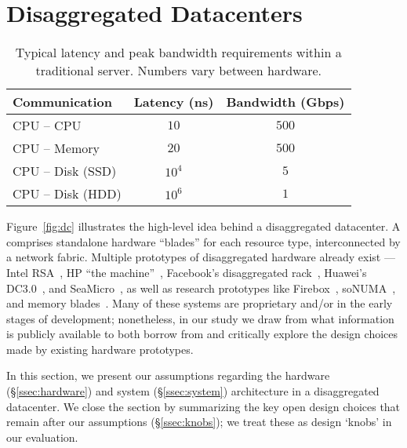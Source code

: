 \vspace{-0.1in}
\section{Disaggregated Datacenters}
\label{sec:summary}
\vspace{-0.05in}


\begin{table}
  \centering
  \small
  \begin{tabular}{l|c|c}
		\textbf{Communication} & \textbf{Latency (ns)} & \textbf{Bandwidth (Gbps)}\\\hline
	\hline
    CPU -- CPU & $10$ & $500$\\\hline
    CPU -- Memory & $20$ & $500$\\\hline
    CPU -- Disk (SSD) & $10^4$ & $5$\\\hline
    CPU -- Disk (HDD) & $10^6$ & $1$\\\hline
    \hline
  \end{tabular}
  \vspace{0.1in}
  \caption{\small{Typical latency and peak bandwidth requirements within a traditional server. Numbers vary between hardware.}}
  \label{tab:tech}
\end{table}

Figure~\ref{fig:dc} illustrates the high-level idea behind a disaggregated datacenter.
A \dis comprises standalone hardware ``blades'' for each resource type,  interconnected by a network fabric.
Multiple prototypes of disaggregated hardware already exist --- Intel RSA~\cite{rsa}, HP ``the machine''~\cite{hptm}, Facebook's disaggregated rack~\cite{fdr}, Huawei's DC3.0~\cite{huawei}, and SeaMicro~\cite{seamicro}, as well as research prototypes like Firebox~\cite{firebox}, soNUMA~\cite{sonuma}, and memory blades~\cite{ddcHwDesign1}. 
Many of these systems are proprietary and/or in the early stages of development; nonetheless, in our study we draw from what information is publicly available to both borrow from and critically explore the design choices made by existing hardware prototypes.

In this section, we present our assumptions regarding the hardware (\S\ref{ssec:hardware}) and system (\S\ref{ssec:system}) architecture in a disaggregated datacenter.
We close the section by summarizing the key open design choices that remain after our assumptions (\S\ref{ssec:knobs}); we treat these as design `knobs' in our evaluation.

